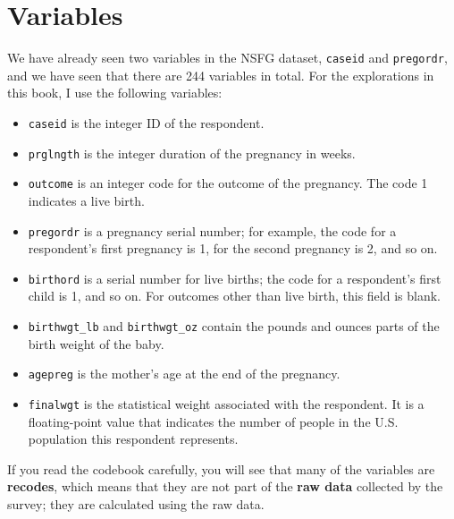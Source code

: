 \section{Variables}

We have already seen two variables in the NSFG dataset, {\tt caseid}
and {\tt pregordr}, and we have seen that there are 244 variables in
total.  For the explorations in this book, I use the following
variables:

\begin{itemize}

\item {\tt caseid} is the integer ID of the respondent.

\item {\tt prglngth} is the integer duration of the pregnancy in weeks.

\item {\tt outcome} is an integer code for the outcome of the
  pregnancy.  The code 1 indicates a live birth.

\item {\tt pregordr} is a pregnancy serial number; for example, the
  code for a respondent's first pregnancy is 1, for the second
  pregnancy is 2, and so on.

\item {\tt birthord} is a serial number for live
  births; the code for a respondent's first child is 1, and so on.
  For outcomes other than live birth, this field is blank.

\item \verb"birthwgt_lb" and \verb"birthwgt_oz" contain the pounds and
  ounces parts of the birth weight of the baby.

\item {\tt agepreg} is the mother's age at the end of the pregnancy.

\item {\tt finalwgt} is the statistical weight associated with the
  respondent.  It is a floating-point value that indicates the number
  of people in the U.S. population this respondent represents.

\end{itemize}

If you read the codebook carefully, you will see that many of the
variables are {\bf recodes}, which means that they are not part of the
{\bf raw data} collected by the survey; they are calculated using
the raw data.   

